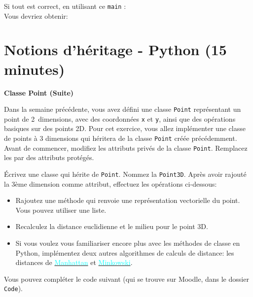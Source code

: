 Si tout est correct, en utilisant ce \lstinline{main} : \\

 

Vous devriez obtenir:
 



\section{Notions d'héritage - Python (15 minutes)}
\begin{Exercice}[15 minutes]\textbf{Classe Point (Suite)}

    Dans la semaine précédente, vous avez défini une classe \lstinline{Point} représentant un point de 2~dimensions, avec des coordonnées \lstinline{x} et \lstinline{y}, ainsi que des opérations basiques sur des points 2D. Pour cet exercice, vous allez implémenter une classe de points à 3 dimensions qui héritera de la classe \lstinline{Point} créée précédemment.
    Avant de commencer, modifiez les attributs privés de la classe \lstinline{Point}. Remplacez les par des attributs protégés.
    
    Écrivez une classe qui hérite de \lstinline{Point}. Nommez la \lstinline{Point3D}. Après avoir rajouté la 3ème dimension comme attribut, effectuez les opérations ci-dessous:
    
    \begin{itemize}
        \item Rajoutez une méthode qui renvoie une représentation vectorielle du point. Vous pouvez utiliser une liste.
        \item Recalculez la distance euclidienne et le milieu pour le point 3D.
        \item \advanced Si vous voulez vous familiariser encore plus avec les méthodes de classe en Python, implémentez deux autres algorithmes de calculs de distance: les distances de \href{https://fr.wikipedia.org/wiki/Distance_de_Manhattan}{\textcolor{cyan}{Manhattan}} et \href{https://en.wikipedia.org/wiki/Minkowski_distance}{\textcolor{cyan}{Minkowski}}.
    \end{itemize}

    Vous pouvez compléter le code suivant (qui se trouve sur Moodle, dans le dossier \lstinline{Code}).
     
    

\end{Exercice}
